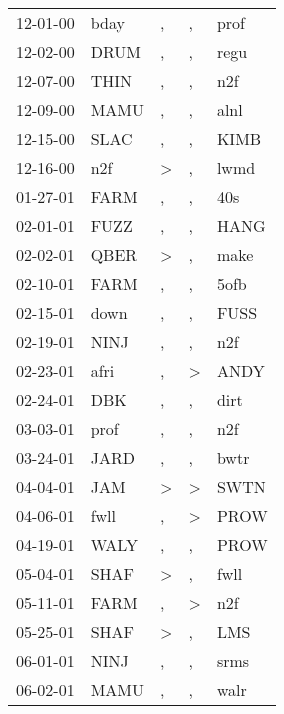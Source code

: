 \begin{supertabular}{lllll}
 12-01-00 &   bday &                , &                , &   prof \\
 12-02-00 &   DRUM &                , &                , &   regu \\
 12-07-00 &   THIN &                , &                , &    n2f \\
 12-09-00 &   MAMU &                , &                , &   alnl \\
 12-15-00 &   SLAC &                , &                , &   KIMB \\
 12-16-00 &    n2f &     \textgreater &                , &   lwmd \\
 01-27-01 &   FARM &                , &                , &    40s \\
 02-01-01 &   FUZZ &                , &                , &   HANG \\
 02-02-01 &   QBER &     \textgreater &                , &   make \\
 02-10-01 &   FARM &                , &                , &   5ofb \\
 02-15-01 &   down &                , &                , &   FUSS \\
 02-19-01 &   NINJ &                , &                , &    n2f \\
 02-23-01 &   afri &                , &     \textgreater &   ANDY \\
 02-24-01 &    DBK &                , &                , &   dirt \\
 03-03-01 &   prof &                , &                , &    n2f \\
 03-24-01 &   JARD &                , &                , &   bwtr \\
 04-04-01 &    JAM &     \textgreater &     \textgreater &   SWTN \\
 04-06-01 &   fwll &                , &     \textgreater &   PROW \\
 04-19-01 &   WALY &                , &                , &   PROW \\
 05-04-01 &   SHAF &     \textgreater &                , &   fwll \\
 05-11-01 &   FARM &                , &     \textgreater &    n2f \\
 05-25-01 &   SHAF &     \textgreater &                , &    LMS \\
 06-01-01 &   NINJ &                , &                , &   srms \\
 06-02-01 &   MAMU &                , &                , &   walr \\

\end{supertabular}
